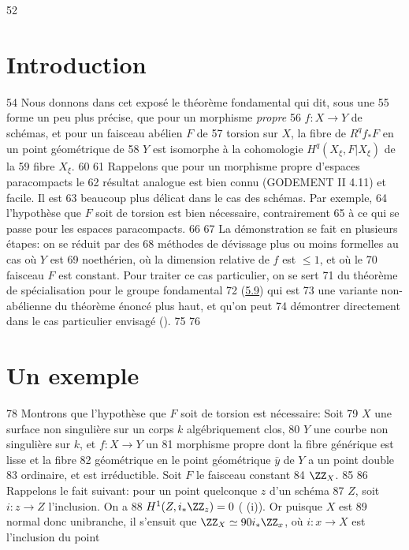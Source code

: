     52	\section{Introduction}	
    54	Nous donnons dans cet exposé le théorème fondamental qui dit, sous une
    55	forme un peu plus précise, que pour un morphisme \emph{propre}
    56	$f:X\rightarrow Y$ de schémas, et pour un faisceau abélien $F$ de
    57	torsion sur $X$, la fibre de $R^qf_{\ast}F$ en un point géométrique de
    58	$Y$ est isomorphe à la cohomologie $H^q(X_{\xi}, F| X_{\xi})$ de la
    59	fibre $X_{\xi}$.
    60	
    61	Rappelons que pour un morphisme propre d'espaces paracompacts le
    62	résultat analogue est bien connu (GODEMENT II 4.11) et facile. Il est
    63	beaucoup plus délicat dans le cas des schémas. Par exemple,
    64	l'hypothèse que $F$ soit de torsion est bien nécessaire, contrairement
    65	à ce qui se passe pour les espaces paracompacts.
    66	
    67	La démonstration se fait en plusieurs étapes: on se réduit par des
    68	méthodes de dévissage plus ou moins formelles au cas où $Y$ est
    69	noethérien, où la dimension relative de $f$ est $\leq 1$, et où le
    70	faisceau $F$ est constant. Pour traiter ce cas particulier, on se sert
    71	du théorème de spécialisation pour le groupe fondamental
    72	(\hyperref[XII.thm5.9]{5.9}) qui est 
    73	une variante non-abélienne du théorème énoncé plus haut, et qu'on peut
    74	démontrer directement dans le cas particulier envisagé ().
    75	
    76	\section{Un exemple}	
    78	Montrons que l'hypothèse que $F$ soit de torsion est nécessaire: Soit
    79	$X$ une surface non singulière sur un corps $k$ algébriquement clos,
    80	$Y$ une courbe non singulière sur $k$, et $f:X\rightarrow Y$ un
    81	morphisme propre dont la fibre générique est lisse et la fibre
    82	géométrique en le point géométrique $\bar{y}$ de $Y$ a un point double
    83	ordinaire, et est irréductible. Soit $F$ le faisceau constant
    84	$\ZZ_X$.
    85	
    86	Rappelons le fait suivant: pour un point quelconque $z$ d'un schéma
    87	$Z$, soit $i:z\rightarrow Z$ l'inclusion. On a
    88	$H^1(Z,i_{\ast}\ZZ_z)=0$ ( (i)). Or puisque $X$ est
    89	normal donc unibranche, il s'ensuit que $\ZZ_X\simeq
    90	i_{\ast}\ZZ_x$, où $i:x\rightarrow X$ est l'inclusion du point
